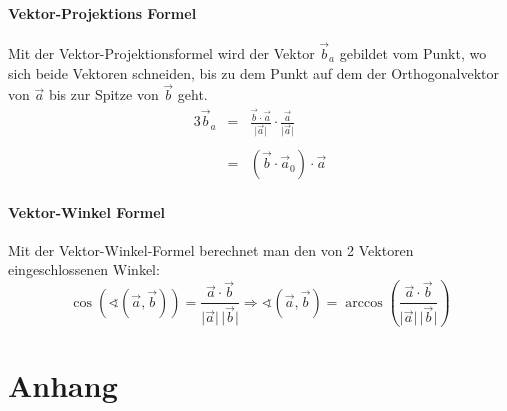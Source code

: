 \documentclass[12pt,a4paper]{scrbook}
\begin{document}
\subsection{Vektor-Projektions Formel}
Mit der Vektor-Projektionsformel wird der Vektor $\vec{b}_a$ gebildet vom Punkt, wo sich beide Vektoren
schneiden, bis zu dem Punkt auf dem der Orthogonalvektor von $\vec{a}$ bis zur Spitze von $\vec{b}$ geht. 
\begin{alignat}{3}
\vec{b}_a & = & \frac{\vec{b} \cdot \vec{a}}{\vert \vec{a} \vert} \cdot \frac{\vec{a}}{\vert \vec{a} \vert}\nonumber \\\nonumber\\
 & = & (\vec{b} \cdot \vec{a}_0) \cdot \vec{a} \nonumber 
\end{alignat}

\subsection{Vektor-Winkel Formel}
Mit der Vektor-Winkel-Formel berechnet man den von 2 Vektoren eingeschlossenen Winkel:
\[ \cos(\sphericalangle(\vec{a}, \vec{b})) = \frac{\vec{a} \cdot \vec{b}}{\vert \vec{a} \vert \, \vert \vec{b} \vert} \Longrightarrow \sphericalangle(\vec{a}, \vec{b}) = \arccos\left(\frac{\vec{a} \cdot \vec{b}}{\vert \vec{a} \vert \, \vert \vec{b} \vert} \right) \] 



\part{Anhang}
\listoffigures
\end{document}

